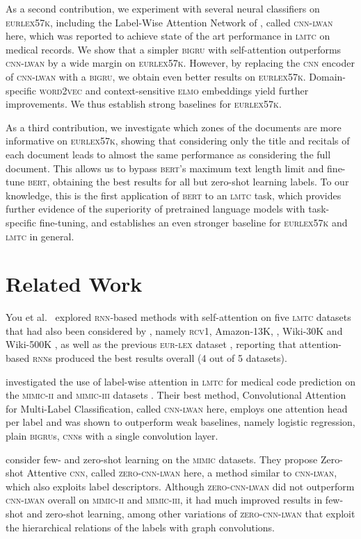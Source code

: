 \documentclass[11pt,a4paper]{article}
\newcommand{\bigru}{\textsc{bigru}\xspace}
\newcommand{\wordvec}{\textsc{word2vec}\xspace}
\newcommand{\rnn}{\textsc{rnn}\xspace}
\newcommand{\cnn}{\textsc{cnn}\xspace}
\newcommand{\lmtc}{\textsc{lmtc}\xspace}
\newcommand{\lwancnn}{\textsc{cnn-lwan}\xspace}
\newcommand{\zlwancnn}{\textsc{zero-cnn-lwan}\xspace}
\newcommand{\elmo}{\textsc{elmo}\xspace}
\newcommand{\bert}{\textsc{bert}\xspace}
\newcommand{\newdata}{\textsc{eurlex57k}\xspace}
\newcommand{\rcv}{\textsc{rcv1}\xspace}
\newcommand{\eurlex}{\textsc{eur-lex}\xspace}
\newcommand{\mimicii}{\textsc{mimic-ii}\xspace}
\newcommand{\mimiciii}{\textsc{mimic-iii}\xspace}
\begin{document}
As a second contribution, we experiment with several neural classifiers on \newdata, including the Label-Wise Attention Network of \citet{Mullenbach2018}, called \lwancnn here, which was reported to achieve state of the art performance in \lmtc on medical records. We show that a simpler \textsc{bigru} with self-attention \cite{Xu2015} outperforms \lwancnn by a wide margin on \newdata. However, by replacing the \cnn encoder of \lwancnn with a \bigru, we obtain even better results on \newdata. Domain-specific \wordvec \cite{Mikolov2013} and context-sensitive \elmo embeddings \cite{Peters2018} yield further improvements. We thus establish strong baselines for \newdata.

As a third contribution, we investigate which zones of the documents are more informative on \newdata, showing that considering only the title and recitals of each document leads to almost the same performance as considering the full document. This allows us to bypass \bert's \cite{bert} maximum text length limit and fine-tune \bert, obtaining the best results for all but zero-shot learning labels. To our knowledge, this is the first application of \bert to an \lmtc task, which provides further evidence of the superiority of pretrained language models with task-specific fine-tuning, and establishes an even stronger baseline for \newdata and \lmtc in general.

\section{Related Work}
\label{sec:relatedwork}

You et al.\  explored \rnn-based methods with self-attention on five \lmtc datasets that had also been considered by \citet{Liu2017}, namely \rcv \cite{Lewis2004}, Amazon-13K, \cite{McAuley2013}, Wiki-30K and Wiki-500K \cite{Zubiaga2012}, as well as the previous \eurlex dataset \cite{Mencia2007}, reporting that attention-based \rnn{s} produced the best results overall (4 out of 5 datasets). 

\citet{Mullenbach2018} investigated the use of label-wise attention in \lmtc for medical code prediction on the \mimicii and \mimiciii datasets \cite{Johnson2017}. Their best method, Convolutional Attention for Multi-Label Classification, called \lwancnn here, employs one attention head per label and was shown to outperform weak baselines, namely logistic regression, plain \bigru{s}, \cnn{s} with a single convolution layer. 

\citet{Rios2018-2} consider few- and zero-shot learning on the \textsc{mimic} datasets. They propose Zero-shot Attentive \cnn, called \zlwancnn here, a method similar to \lwancnn, which also exploits label descriptors. Although \zlwancnn did not outperform \lwancnn overall on \mimicii and \mimiciii, it had much improved results in few-shot and zero-shot learning, among other variations of \zlwancnn that exploit the hierarchical relations of the labels with graph convolutions.
\end{document}
